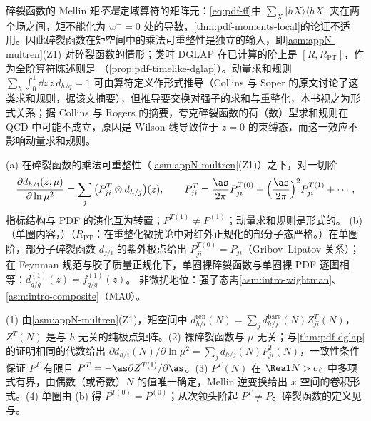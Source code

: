 \begin{remark}[碎裂函数的乘法可重整性是独立输入]\label{rem:pdf-ff-multren}
碎裂函数的 Mellin 矩\emph{不是}定域算符的矩阵元：\cref{eq:pdf-ff}中 $\sum_X|hX\rangle\langle hX|$ 夹在两个场之间，矩不能化为 $w^-=0$ 处的导数，\cref{thm:pdf-moments-local}的论证不适用。因此碎裂函数在矩空间中的乘法可重整性是独立的输入，即\cref{asm:appN-multren}(Z1) 对碎裂函数的情形；类时 DGLAP 在已计算的阶上是 $[R,R_{\mathrm{PT}}]$，作为全阶算符陈述则是 \tagA（\cref{prop:pdf-timelike-dglap}）。动量求和规则 $\sum_h\int_0^1\dd z\,z\,d_{h/q}=1$ 可由算符定义作形式推导（Collins 与 Soper 的原文讨论了这类求和规则，据该文摘要\cite{CollinsSoper1982a}），但推导要交换对强子的求和与重整化，本书视之为形式关系；据 Collins 与 Rogers 的摘要\cite{Collins:2023cuo}，夸克碎裂函数的荷（数）型求和规则在 QCD 中可能不成立，原因是 Wilson 线导致位于 $z=0$ 的束缚态，而这一效应不影响动量求和规则。
\end{remark}

\begin{proposition}\label{prop:pdf-timelike-dglap}
(a) 在碎裂函数的乘法可重整性（\cref{asm:appN-multren}(Z1)）之下，对一切阶
\begin{equation}\label{eq:pdf-tdglap}
\frac{\partial d_{h/i}(z;\mu)}{\partial\ln\mu^2}=\sum_j\big(P^T_{ji}\otimes d_{h/j}\big)(z),\qquad P^T_{ji}=\frac{\as}{2\pi}P^{T(0)}_{ji}+\Big(\frac{\as}{2\pi}\Big)^2P^{T(1)}_{ji}+\cdots,
\end{equation}
指标结构与 PDF 的演化互为转置；$P^{T(1)}\ne P^{(1)}$\cite{CurciFurmanskiPetronzio1980}；动量求和规则是形式的。
(b)（单圈内容，\tagR）（$R_{\mathrm{PT}}$：在重整化微扰论中对红外正规化的部分子态严格。）在单圈阶，部分子碎裂函数 $d_{j/i}$ 的紫外极点给出 $P^{T(0)}_{ji}=P_{ji}$（Gribov--Lipatov 关系\cite{GribovLipatov1972b}）；在 Feynman 规范与胶子质量正规化下，单圈裸碎裂函数与单圈裸 PDF 逐图相等：$d^{(1)}_{q/q}(z)=f^{(1)}_{q/q}(z)$。
非微扰地位：强子态需\cref{asm:intro-wightman}、\cref{asm:intro-composite}（MA0）。
\end{proposition}

\begin{proofsketch}[(a) 的证明概要]
(1) 由\cref{asm:appN-multren}(Z1)，矩空间中 $d^{\mathrm{ren}}_{h/i}(N)=\sum_jd^{\mathrm{bare}}_{h/j}(N)Z^T_{ji}(N)$，$Z^T(N)$ 是与 $h$ 无关的纯极点矩阵。(2) 裸碎裂函数与 $\mu$ 无关；与\cref{thm:pdf-dglap}的证明相同的代数给出 $\partial d_{h/i}(N)/\partial\ln\mu^2=\sum_jd_{h/j}(N)P^T_{ji}(N)$，一致性条件保证 $P^T$ 有限且 $P^T=-\as\partial Z^{T(1)}/\partial\as$。(3) $P^T(N)$ 在 $\Real N>\sigma_0$ 中多项式有界，由偶数（或奇数）$N$ 的值唯一确定，Mellin 逆变换给出 $x$ 空间的卷积形式。(4) 单圈由 (b) 得 $P^{T(0)}=P^{(0)}$；从次领头阶起 $P^T\ne P$。碎裂函数的定义见\cite{CollinsSoper1982a}与\cite[第~12.4~节]{Collins2011}。
\end{proofsketch}

